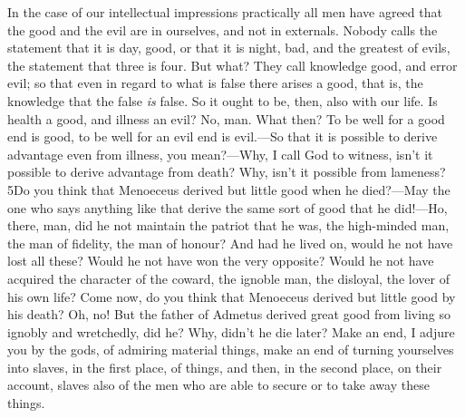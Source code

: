 In the case of our intellectual impressions practically all men have agreed that the good and the evil are in ourselves, and not in externals. Nobody calls the statement that it is day, good, or that it is night, bad, and the greatest of evils, the statement that three is four. But what? They call knowledge good, and error evil; so that even in regard to what is false there arises a good, that is, the knowledge that the false \emph{is} false. So it ought to be, then, also with our life. Is health a good, and illness an evil? No, man. What then? To be well for a good end is good, to be well for an evil end is evil.—So that it is possible to derive advantage even from illness, you mean?—Why, I call God to witness, isn't it possible to derive advantage from death? Why, isn't it possible from lameness? 5Do you think that Menoeceus derived but little good when he died?—May the one who says anything like that derive the same sort of good that he did!—Ho, there, man, did he not maintain the patriot that he was, the high-minded man, the man of fidelity, the man of honour? And had he lived on, would he not have lost all these? Would he not have won the very opposite? Would he not have acquired the character of the coward, the ignoble man, the disloyal, the lover of his own life? Come now, do you think that Menoeceus derived but little good by his death? Oh, no! But the father of Admetus derived great good from living so ignobly and wretchedly, did he? Why, didn't he die later? Make an end, I adjure you by the gods, of admiring material things, make an end of turning yourselves into slaves, in the first place, of things, and then, in the second place, on their account, slaves also of the men who are able to secure or to take away these things.

